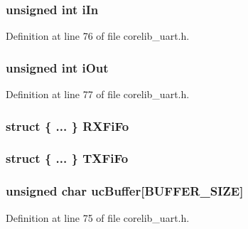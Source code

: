 \subsubsection[{i\-In}]{\setlength{\rightskip}{0pt plus 5cm}unsigned int i\-In}\label{corelib__uart_8h_aa439df2901a799690275b0c20fc85c8f}


Definition at line 76 of file corelib\-\_\-uart.\-h.

\subsubsection[{i\-Out}]{\setlength{\rightskip}{0pt plus 5cm}unsigned int i\-Out}\label{corelib__uart_8h_a2099e8bfe004ae2e2e0e5dcbc5ff7a75}


Definition at line 77 of file corelib\-\_\-uart.\-h.

\subsubsection[{R\-X\-Fi\-Fo}]{\setlength{\rightskip}{0pt plus 5cm}struct \{ ... \}   R\-X\-Fi\-Fo}\label{corelib__uart_8h_ac3c8fda82266ec9e5fba3b1285831e42}
\subsubsection[{T\-X\-Fi\-Fo}]{\setlength{\rightskip}{0pt plus 5cm}struct \{ ... \}  T\-X\-Fi\-Fo}\label{corelib__uart_8h_a13e4e4e6c8e63567fb59f1b2ad920c64}
\subsubsection[{uc\-Buffer}]{\setlength{\rightskip}{0pt plus 5cm}unsigned char uc\-Buffer[{\bf B\-U\-F\-F\-E\-R\-\_\-\-S\-I\-Z\-E}]}\label{corelib__uart_8h_a2e2f12c2d2723f15fa34d754c9cd8324}


Definition at line 75 of file corelib\-\_\-uart.\-h.

